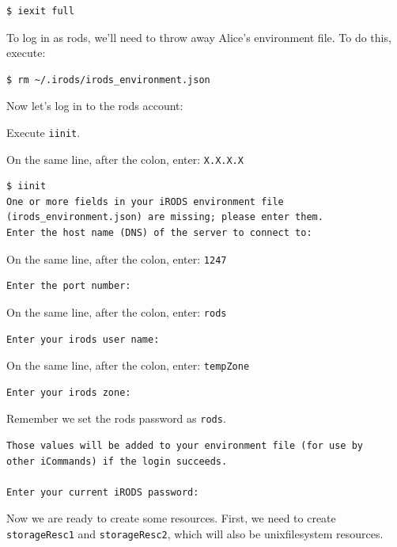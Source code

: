 \documentclass[10pt,oneside]{memoir}
\begin{document}
\begin{lstlisting}
$ iexit full
\end{lstlisting}

To log in as rods, we'll need to throw away Alice's environment file. To do this, execute:

\begin{lstlisting}
$ rm ~/.irods/irods_environment.json
\end{lstlisting}

Now let's log in to the rods account:

Execute \texttt{iinit}.

On the same line, after the colon, enter: \texttt{X.X.X.X}

\begin{lstlisting}[basicstyle=\scriptsize\ttfamily]
$ iinit
One or more fields in your iRODS environment file (irods_environment.json) are missing; please enter them.
Enter the host name (DNS) of the server to connect to:
\end{lstlisting}

On the same line, after the colon, enter: \texttt{1247}

\begin{lstlisting}[basicstyle=\scriptsize\ttfamily]
Enter the port number:
\end{lstlisting}

On the same line, after the colon, enter: \texttt{rods}

\begin{lstlisting}[basicstyle=\scriptsize\ttfamily]
Enter your irods user name:
\end{lstlisting}

On the same line, after the colon, enter: \texttt{tempZone}

\begin{lstlisting}[basicstyle=\scriptsize\ttfamily]
Enter your irods zone:
\end{lstlisting}

\newpage

Remember we set the rods password as \texttt{rods}.

\begin{lstlisting}[basicstyle=\scriptsize\ttfamily]
Those values will be added to your environment file (for use by
other iCommands) if the login succeeds.

Enter your current iRODS password:
\end{lstlisting}

Now we are ready to create some resources. First, we need to create \texttt{storageResc1} and \texttt{storageResc2}, which will also be unixfilesystem resources.
\end{document}
